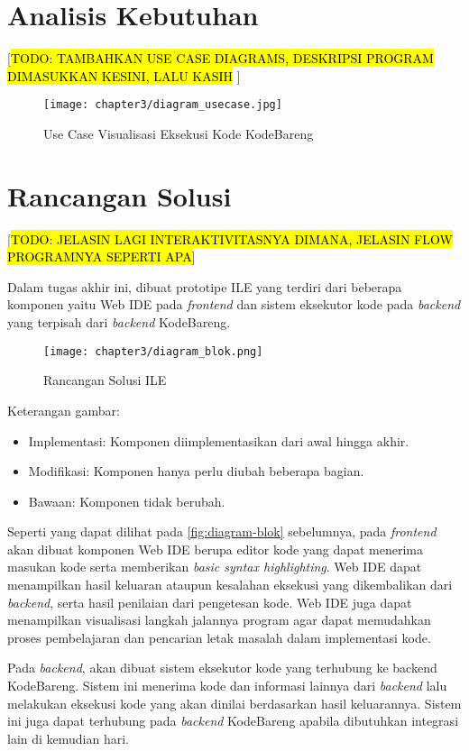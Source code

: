 \section{Analisis Kebutuhan}
 [\hl{TODO: TAMBAHKAN USE CASE DIAGRAMS, DESKRIPSI PROGRAM DIMASUKKAN KESINI, LALU KASIH }]

\begin{figure}[H]
  \centering
  \texttt{[image: chapter3/diagram\_usecase.jpg]}
  \caption{Use Case Visualisasi Eksekusi Kode KodeBareng} \label{fig:diagram-usecase}
\end{figure}

\section{Rancangan Solusi}
 [\hl{TODO: JELASIN LAGI INTERAKTIVITASNYA DIMANA, JELASIN FLOW PROGRAMNYA SEPERTI APA}]

Dalam tugas akhir ini, dibuat prototipe ILE yang terdiri dari beberapa komponen yaitu Web IDE pada \textit{frontend} dan sistem eksekutor kode pada \textit{backend} yang terpisah dari \textit{backend} KodeBareng.

\begin{figure}[H]
  \centering
  \texttt{[image: chapter3/diagram\_blok.png]}
  \caption{Rancangan Solusi ILE} \label{fig:diagram-blok}
\end{figure}

Keterangan gambar:
\begin{itemize}
  \setlength\itemsep{-0.2cm}
  \item Implementasi: Komponen diimplementasikan dari awal hingga akhir.
  \item Modifikasi: Komponen hanya perlu diubah beberapa bagian.
  \item Bawaan: Komponen tidak berubah.
\end{itemize}

Seperti yang dapat dilihat pada \autoref{fig:diagram-blok} sebelumnya, pada \textit{frontend} akan dibuat komponen Web IDE berupa editor kode yang dapat menerima masukan kode serta memberikan \textit{basic syntax highlighting}. Web IDE dapat menampilkan hasil keluaran ataupun kesalahan eksekusi yang dikembalikan dari \textit{backend}, serta hasil penilaian dari pengetesan kode. Web IDE juga dapat menampilkan visualisasi langkah jalannya program agar dapat memudahkan proses pembelajaran dan pencarian letak masalah dalam implementasi kode.

Pada \textit{backend}, akan dibuat sistem eksekutor kode yang terhubung ke backend KodeBareng. Sistem ini menerima kode dan informasi lainnya dari \textit{backend} lalu melakukan eksekusi kode yang akan dinilai berdasarkan hasil keluarannya. Sistem ini juga dapat terhubung pada \textit{backend} KodeBareng apabila dibutuhkan integrasi lain di kemudian hari.

